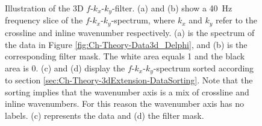\begin{figure}
	\caption{Illustration of the 3D $f$-$k_x$-$k_y$-filter. (a) and (b) show a \SI{40}{\hertz} frequency slice of the $f$-$k_x$-$k_y$-spectrum, where $k_x$ and $k_y$ refer to the crossline and inline wavenumber respectively. (a) is the spectrum of the data in Figure \ref{fig:Ch-Theory-Data3d_Delphi}, and (b) is the corresponding filter mask. The white area equals 1 and the black area is 0. (c) and (d) display the $f$-$k_x$-$k_y$-spectrum sorted according to section \ref{sec:Ch-Theory-3dExtension-DataSorting}.  Note that the sorting implies that the wavenumber axis is a mix of crossline and inline wavenumbers. For this reason the wavenumber axis has no labels. (c) represents the data and (d) the filter mask.}
	\label{fig:Ch-Theory-FKK-Mask}

\end{figure}